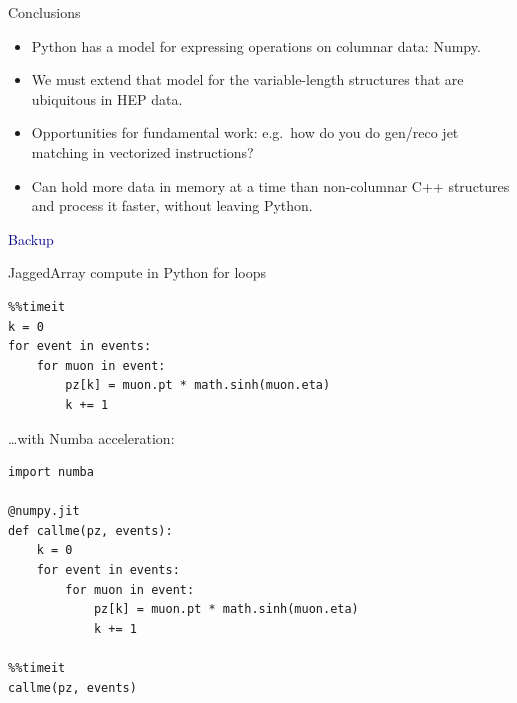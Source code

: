 \documentclass[aspectratio=169]{beamer}
\begin{document}
\begin{frame}{Conclusions}
\vspace{0.5 cm}
\large
\begin{itemize}\setlength{\itemsep}{0.5 cm}
\item Python has a model for expressing operations on columnar data: Numpy.
\item We must extend that model for the variable-length structures that are ubiquitous in HEP data.
\item Opportunities for fundamental work: e.g.\ how do you do gen/reco jet matching in vectorized instructions?
\item Can hold more data in memory at a time than non-columnar C++ structures and process it faster, without leaving Python.
\end{itemize}
\end{frame}

\begin{frame}
\huge
\begin{center}
\textcolor{darkblue}{Backup}
\end{center}
\end{frame}

\begin{frame}[fragile]{JaggedArray compute in Python for loops}
\vspace{0.3 cm}
\scriptsize
\begin{verbatim}
%%timeit
k = 0
for event in events:
    for muon in event:
        pz[k] = muon.pt * math.sinh(muon.eta)
        k += 1
\end{verbatim}

\vspace{0.5 cm}
\hfill\begin{minipage}{0.6\linewidth}
{\normalsize \ldots with Numba acceleration:}
\begin{verbatim}
import numba

@numpy.jit
def callme(pz, events):
    k = 0
    for event in events:
        for muon in event:
            pz[k] = muon.pt * math.sinh(muon.eta)
            k += 1

%%timeit
callme(pz, events)
\end{verbatim}
\end{minipage}
\end{frame}
\end{document}
